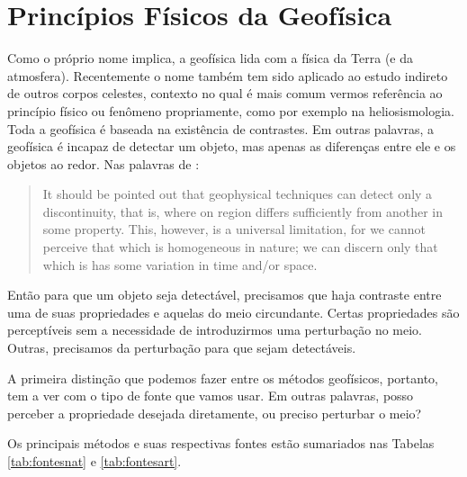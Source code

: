\documentclass[0000]{subfiles}
\begin{document}
\section{Princ\'ipios F\'{i}sicos da Geof\'{i}sica} 
	Como o pr\'{o}prio nome implica, a geof\'{i}sica lida com a f\'{i}sica da Terra (e da atmosfera).
	Recentemente o nome tamb\'{e}m tem sido aplicado ao estudo indireto de outros corpos celestes, contexto no qual \'{e} mais comum vermos refer\^{e}ncia ao princ\'{i}pio f\'{i}sico ou fen\^{o}meno propriamente, como por exemplo na heliosismologia.
	Toda a geof\'{i}sica \'{e} baseada na exist\^{e}ncia de contrastes.
	Em outras palavras, a geof\'{i}sica \'{e} incapaz de detectar um objeto, mas apenas as diferen\c{c}as entre ele e os objetos ao redor.
	Nas palavras de \citeauthor{telford_applied_1990}:
	\begin{quote}
	It should be pointed out that geophysical techniques can detect only a discontinuity, that is, where on region differs sufficiently from another in some property.
	This, however, is a universal limitation, for we cannot perceive that which is homogeneous in nature; we can discern only that which is has some variation in time and/or space.
	\end{quote}
	
	Ent\~{a}o para que um objeto seja detect\'{a}vel, precisamos que haja contraste entre uma de suas propriedades e aquelas do meio circundante.
	Certas propriedades s\~{a}o percept\'{i}veis sem a necessidade de introduzirmos uma perturba\c{c}\~{a}o no meio.
	Outras, precisamos da perturba\c{c}\~{a}o para que sejam detect\'{a}veis.

	A primeira distin\c{c}\~{a}o que podemos fazer entre os m\'{e}todos geof\'{i}sicos, portanto, tem a ver com o tipo de fonte que vamos usar.
	Em outras palavras, posso perceber a propriedade desejada diretamente, ou preciso perturbar o meio?

	Os principais m\'{e}todos e suas respectivas fontes est\~{a}o sumariados nas Tabelas \ref{tab:fontesnat} e \ref{tab:fontesart}.
\end{document}
